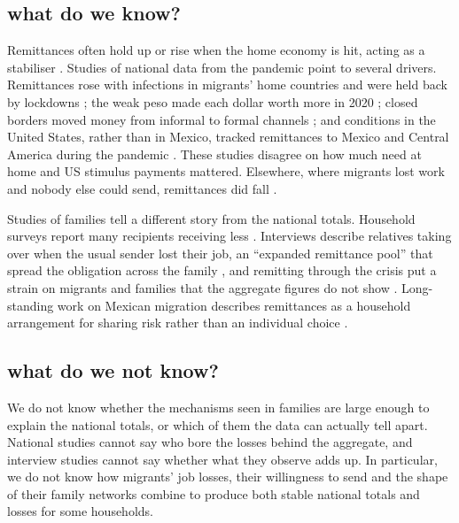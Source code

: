 \documentclass[11pt]{article}
\begin{document}
\subsection{what do we know?}
{
Remittances often hold up or rise when the home economy is hit, acting as a stabiliser \cite{beaton2017migration}. Studies of national data from the pandemic point to several drivers. Remittances rose with infections in migrants' home countries and were held back by lockdowns \cite{kpodarDefying}; the weak peso made each dollar worth more in 2020 \cite{mandelman2020remittances}; closed borders moved money from informal to formal channels \cite{dinarte2022neither}; and conditions in the United States, rather than in Mexico, tracked remittances to Mexico and Central America during the pandemic \cite{ambrosius2023migrant, babii2022evolution}. These studies disagree on how much need at home and US stimulus payments mattered. Elsewhere, where migrants lost work and nobody else could send, remittances did fall \cite{guha2021covid}.

Studies of families tell a different story from the national totals. Household surveys report many recipients receiving less \cite{ratha2021resilience, dinarte2022neither}. Interviews describe relatives taking over when the usual sender lost their job, an ``expanded remittance pool'' that spread the obligation across the family \cite{ventura2024resilient}, and remitting through the crisis put a strain on migrants and families that the aggregate figures do not show \cite{lindley2024remitting}. Long-standing work on Mexican migration describes remittances as a household arrangement for sharing risk rather than an individual choice \cite{sana2005household, amuedo2006insurance}.
}

\subsection{what do we not know?}
{
We do not know whether the mechanisms seen in families are large enough to explain the national totals, or which of them the data can actually tell apart. National studies cannot say who bore the losses behind the aggregate, and interview studies cannot say whether what they observe adds up. In particular, we do not know how migrants' job losses, their willingness to send and the shape of their family networks combine to produce both stable national totals and losses for some households.
}
\end{document}
